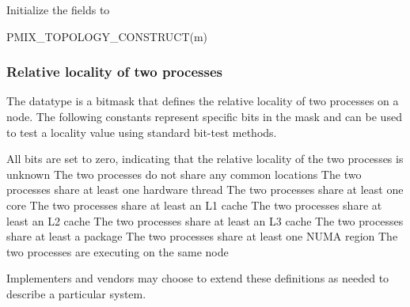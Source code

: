 Initialize the  fields to 

\cspecificstart
\begin{codepar}
PMIX_TOPOLOGY_CONSTRUCT(m)
\end{codepar}
\cspecificend

\begin{arglist}
\end{arglist}


\subsubsection{Relative locality of two processes}

The  datatype is a  bitmask that
defines the relative locality of two processes on a node. The following
constants represent specific bits in the mask and can be used to test a
locality value using standard bit-test methods.

\begin{constantdesc}
%
All bits are set to zero, indicating that the relative locality of the two processes is unknown
%
The two processes do not share any common locations
%
The two processes share at least one hardware thread
%
The two processes share at least one core
%
The two processes share at least an L1 cache
%
The two processes share at least an L2 cache
%
The two processes share at least an L3 cache
%
The two processes share at least a package
%
The two processes share at least one \ac{NUMA} region
%
The two processes are executing on the same node
%
\end{constantdesc}


Implementers and vendors may choose to extend these definitions as needed to describe a particular system.


